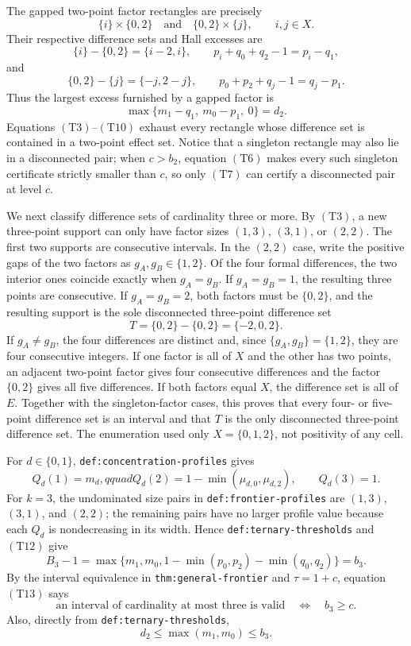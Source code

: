 The gapped two-point factor rectangles are precisely
\[
\{i\}\times\{0,2\}
\quad\text{and}\quad
\{0,2\}\times\{j\},
\qquad i,j\in X.
\tag{T7}
\]
Their respective difference sets and Hall excesses are
\[
\{i\}-\{0,2\}=\{i-2,i\},
\qquad p_i+q_0+q_2-1=p_i-q_1,
\tag{T8}
\]
and
\[
\{0,2\}-\{j\}=\{-j,2-j\},
\qquad p_0+p_2+q_j-1=q_j-p_1.
\tag{T9}
\]
Thus the largest excess furnished by a gapped factor is
\[
\max\{m_1-q_1,\ m_0-p_1,\ 0\}=d_2.
\tag{T10}
\]
Equations \((\mathrm{T3})\)--\((\mathrm{T10})\) exhaust every rectangle whose difference set is contained in a two-point effect set.  Notice that a singleton rectangle may also lie in a disconnected pair; when \(c>b_2\), equation \((\mathrm{T6})\) makes every such singleton certificate strictly smaller than \(c\), so only \((\mathrm{T7})\) can certify a disconnected pair at level \(c\).

We next classify difference sets of cardinality three or more.  By \((\mathrm{T3})\), a new three-point support can only have factor sizes \((1,3)\), \((3,1)\), or \((2,2)\).  The first two supports are consecutive intervals.  In the \((2,2)\) case, write the positive gaps of the two factors as \(g_A,g_B\in\{1,2\}\).  Of the four formal differences, the two interior ones coincide exactly when \(g_A=g_B\).  If \(g_A=g_B=1\), the resulting three points are consecutive.  If \(g_A=g_B=2\), both factors must be \(\{0,2\}\), and the resulting support is the sole disconnected three-point difference set
\[
T=\{0,2\}-\{0,2\}=\{-2,0,2\}.
\tag{T11}
\]
If \(g_A\neq g_B\), the four differences are distinct and, since \(\{g_A,g_B\}=\{1,2\}\), they are four consecutive integers.  If one factor is all of \(X\) and the other has two points, an adjacent two-point factor gives four consecutive differences and the factor \(\{0,2\}\) gives all five differences.  If both factors equal \(X\), the difference set is all of \(E\).  Together with the singleton-factor cases, this proves that every four- or five-point difference set is an interval and that \(T\) is the only disconnected three-point difference set.  The enumeration used only \(X=\{0,1,2\}\), not positivity of any cell.

For \(d\in\{0,1\}\), \texttt{def:concentration-profiles} gives
\[
Q_d(1)=m_d,qquad
Q_d(2)=1-\min(\mu_{d,0},\mu_{d,2}),
\qquad Q_d(3)=1.
\tag{T12}
\]
For \(k=3\), the undominated size pairs in \texttt{def:frontier-profiles} are \((1,3)\), \((3,1)\), and \((2,2)\); the remaining pairs have no larger profile value because each \(Q_d\) is nondecreasing in its width.  Hence \texttt{def:ternary-thresholds} and \((\mathrm{T12})\) give
\[
B_3-1
=\max\{m_1,m_0,1-\min(p_0,p_2)-\min(q_0,q_2)\}
=b_3.
\tag{T13}
\]
By the interval equivalence in \texttt{thm:general-frontier} and \(\tau=1+c\), equation \((\mathrm{T13})\) says
\[
\text{an interval of cardinality at most three is valid}
\quad\Longleftrightarrow\quad b_3\geq c.
\tag{T14}
\]
Also, directly from \texttt{def:ternary-thresholds},
\[
d_2\leq\max(m_1,m_0)\leq b_3.
\tag{T15}
\]

